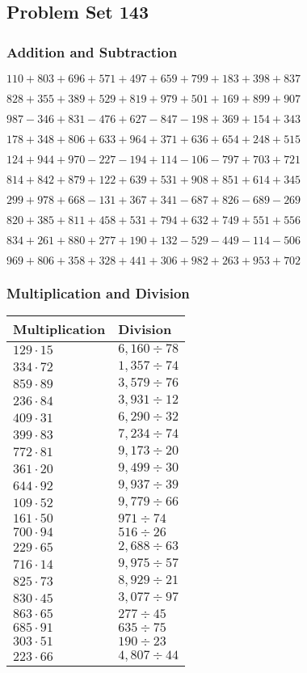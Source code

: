 \hypertarget{problem-set-143}{%
\subsection{Problem Set 143}\label{problem-set-143}}

\hypertarget{addition-and-subtraction}{%
\subsubsection{Addition and
Subtraction}\label{addition-and-subtraction}}

\(110 +803 +696 +571 +497 +659 +799 +183 +398 +837\)

\(828 +355 +389 +529 +819 +979 +501 +169 +899 +907\)

\(987 - 346 +831 - 476 +627 - 847 - 198 +369 +154 +343\)

\(178 +348 +806 +633 +964 +371 +636 +654 +248 +515\)

\(124 +944 +970 - 227 - 194 +114 - 106 - 797 +703 +721\)

\(814 +842 +879 +122 +639 +531 +908 +851 +614 +345\)

\(299 +978 +668 - 131 +367 +341 - 687 +826 - 689 - 269\)

\(820 +385 +811 +458 +531 +794 +632 +749 +551 +556\)

\(834 +261 +880 +277 +190 +132 - 529 - 449 - 114 - 506\)

\(969 +806 +358 +328 +441 +306 +982 +263 +953 +702\)

\hypertarget{multiplication-and-division}{%
\subsubsection{Multiplication and
Division}\label{multiplication-and-division}}

\begin{longtable}[]{@{}ll@{}}
\toprule
Multiplication & Division\tabularnewline
\midrule
\endhead
\(129 \cdot 15\) & \(6,160÷78\)\tabularnewline
\(334 \cdot 72\) & \(1,357÷74\)\tabularnewline
\(859 \cdot 89\) & \(3,579÷76\)\tabularnewline
\(236 \cdot 84\) & \(3,931÷12\)\tabularnewline
\(409 \cdot 31\) & \(6,290÷32\)\tabularnewline
\(399 \cdot 83\) & \(7,234÷74\)\tabularnewline
\(772 \cdot 81\) & \(9,173÷20\)\tabularnewline
\(361 \cdot 20\) & \(9,499÷30\)\tabularnewline
\(644 \cdot 92\) & \(9,937÷39\)\tabularnewline
\(109 \cdot 52\) & \(9,779÷66\)\tabularnewline
\(161 \cdot 50\) & \(971÷74\)\tabularnewline
\(700 \cdot 94\) & \(516÷26\)\tabularnewline
\(229 \cdot 65\) & \(2,688÷63\)\tabularnewline
\(716 \cdot 14\) & \(9,975÷57\)\tabularnewline
\(825 \cdot 73\) & \(8,929÷21\)\tabularnewline
\(830 \cdot 45\) & \(3,077÷97\)\tabularnewline
\(863 \cdot 65\) & \(277÷45\)\tabularnewline
\(685 \cdot 91\) & \(635÷75\)\tabularnewline
\(303 \cdot 51\) & \(190÷23\)\tabularnewline
\(223 \cdot 66\) & \(4,807÷44\)\tabularnewline
\bottomrule
\end{longtable}
